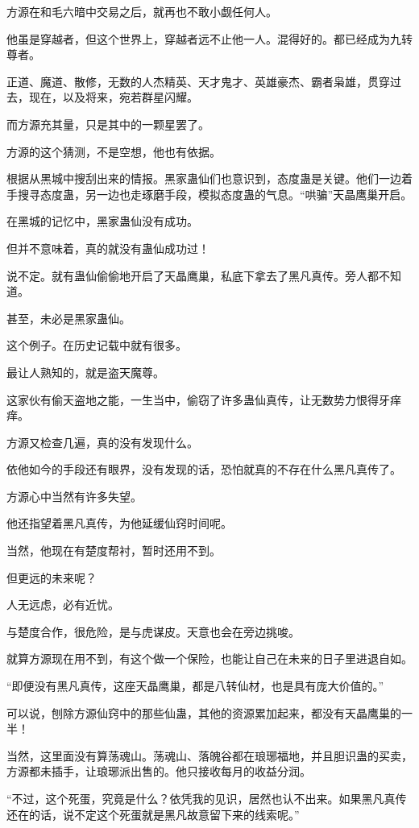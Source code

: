 \begin{this_body}
方源在和毛六暗中交易之后，就再也不敢小觑任何人。

他虽是穿越者，但这个世界上，穿越者远不止他一人。混得好的。都已经成为九转尊者。

正道、魔道、散修，无数的人杰精英、天才鬼才、英雄豪杰、霸者枭雄，贯穿过去，现在，以及将来，宛若群星闪耀。

而方源充其量，只是其中的一颗星罢了。

方源的这个猜测，不是空想，他也有依据。

根据从黑城中搜刮出来的情报。黑家蛊仙们也意识到，态度蛊是关键。他们一边着手搜寻态度蛊，另一边也走琢磨手段，模拟态度蛊的气息。“哄骗”天晶鹰巢开启。

在黑城的记忆中，黑家蛊仙没有成功。

但并不意味着，真的就没有蛊仙成功过！

说不定。就有蛊仙偷偷地开启了天晶鹰巢，私底下拿去了黑凡真传。旁人都不知道。

甚至，未必是黑家蛊仙。

这个例子。在历史记载中就有很多。

最让人熟知的，就是盗天魔尊。

这家伙有偷天盗地之能，一生当中，偷窃了许多蛊仙真传，让无数势力恨得牙痒痒。

方源又检查几遍，真的没有发现什么。

依他如今的手段还有眼界，没有发现的话，恐怕就真的不存在什么黑凡真传了。

方源心中当然有许多失望。

他还指望着黑凡真传，为他延缓仙窍时间呢。

当然，他现在有楚度帮衬，暂时还用不到。

但更远的未来呢？

人无远虑，必有近忧。

与楚度合作，很危险，是与虎谋皮。天意也会在旁边挑唆。

就算方源现在用不到，有这个做一个保险，也能让自己在未来的日子里进退自如。

“即便没有黑凡真传，这座天晶鹰巢，都是八转仙材，也是具有庞大价值的。”

可以说，刨除方源仙窍中的那些仙蛊，其他的资源累加起来，都没有天晶鹰巢的一半！

当然，这里面没有算荡魂山。荡魂山、落魄谷都在琅琊福地，并且胆识蛊的买卖，方源都未插手，让琅琊派出售的。他只接收每月的收益分润。

“不过，这个死蛋，究竟是什么？依凭我的见识，居然也认不出来。如果黑凡真传还在的话，说不定这个死蛋就是黑凡故意留下来的线索呢。”


\end{this_body}
